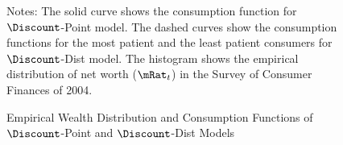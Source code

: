 \begin{figure}
\caption{Empirical Wealth Distribution and Consumption Functions of
$\Discount$-Point and $\Discount$-Dist Models}
\label{CFuncDistSevenPointPermAndHistNetWorthPlotFedQuarterly}
\footnotesize Notes: The solid curve shows the consumption function
for $\Discount$-Point model.  The dashed curves show the consumption functions
for the most patient and the least patient consumers for
$\Discount$-Dist model. The histogram shows the empirical distribution of
net worth ($\mRat_{t}$) in the Survey of Consumer Finances of 2004.
\end{figure}
